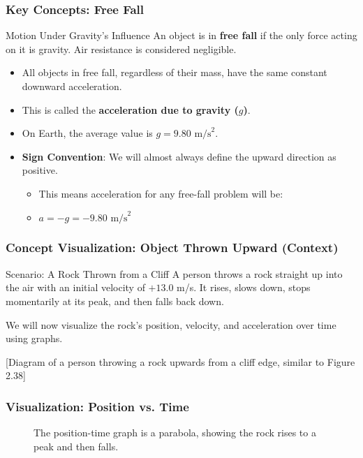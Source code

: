 \documentclass{beamer}
\begin{document}
\begin{frame}
\frametitle{Key Concepts: Free Fall}
\begin{block}{Motion Under Gravity's Influence}
An object is in \textbf{free fall} if the only force acting on it is gravity. Air resistance is considered negligible.
\end{block}
\begin{itemize}
    \item All objects in free fall, regardless of their mass, have the same constant downward acceleration.
    \item This is called the \textbf{acceleration due to gravity ($g$)}.
    \item On Earth, the average value is $g = 9.80 \text{ m/s}^2$.
    \item \textbf{Sign Convention}: We will almost always define the \alert{upward} direction as positive.
    \begin{itemize}
        \item This means acceleration for any free-fall problem will be:
        \item $a = -g = -9.80 \text{ m/s}^2$
    \end{itemize}
\end{itemize}
\end{frame}

\begin{frame}
\frametitle{Concept Visualization: Object Thrown Upward (Context)}
\begin{block}{Scenario: A Rock Thrown from a Cliff}
A person throws a rock straight up into the air with an initial velocity of $+13.0$ m/s. It rises, slows down, stops momentarily at its peak, and then falls back down.

We will now visualize the rock's position, velocity, and acceleration over time using graphs.
\end{block}
\begin{center}
\alert{[Diagram of a person throwing a rock upwards from a cliff edge, similar to Figure 2.38]}
\end{center}
\end{frame}

\begin{frame}
\frametitle{Visualization: Position vs. Time}
\begin{figure}
\caption{The position-time graph is a parabola, showing the rock rises to a peak and then falls.}
\end{figure}
\end{frame}
\end{document}
